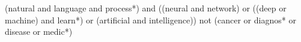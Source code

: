 (natural and language and process*) and ((neural and network) or ((deep or machine) and learn*) or (artificial and intelligence)) not (cancer or diagnos* or disease or medic*)